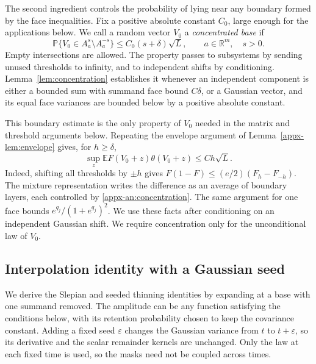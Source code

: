 \documentclass[11pt,letterpaper]{article}
\theoremstyle{remark}
\newcommand{\E}{\mathbb E}
\newcommand{\Pp}{\mathbb P}
\newcommand{\R}{\mathbb R}
\begin{document}
The second ingredient controls the probability of lying near any
boundary formed by the face inequalities. Fix a positive absolute
constant \(C_0\), large enough for the applications below. We call
a random vector \(V_0\) a \emph{concentrated base} if
\begin{equation}
 \Pp\{V_0\in A_a^s\setminus A_a^{-s}\}
 \le C_0(s+\delta)\sqrt L,
 \qquad a\in\R^m,\quad s>0.
 \label{appx-an:concentration}
\end{equation}
Empty intersections are allowed. The property passes to subsystems
by sending unused thresholds to infinity, and to independent shifts
by conditioning. Lemma~\ref{lem:concentration} establishes it whenever an independent component is
either a bounded sum with summand face bound \(C\delta\), or a
Gaussian vector, and its equal face variances are bounded below by
a positive absolute constant.

This boundary estimate is the only property of \(V_0\) needed in the
matrix and threshold arguments below. Repeating the envelope argument of
Lemma~\ref{appx-lem:envelope} gives, for \(h\ge\delta\),
\begin{equation}
 \sup_z\E F(V_0+z)\theta(V_0+z)\le Ch\sqrt L.
 \label{appx-an:weight-concentration}
\end{equation}
Indeed, shifting all thresholds by \(\pm h\) gives
\(F(1-F)\le(e/2)(F_h-F_{-h})\). The mixture representation writes
the difference as an average of boundary layers, each controlled by
\eqref{appx-an:concentration}. The same argument for one face bounds
\(e^{q_j}/(1+e^{q_j})^2\). We use these facts after conditioning on
an independent Gaussian shift. We require concentration only for the
unconditional law of \(V_0\).

\subsection{Interpolation identity with a Gaussian seed}
\label{appx-an:sec:path}

We derive the Slepian and seeded thinning identities by expanding at
a base with one summand removed. The amplitude can be any function
satisfying the conditions below, with its retention probability chosen
to keep the covariance constant. Adding a fixed seed \(\varepsilon\)
changes the Gaussian variance from \(t\) to \(t+\varepsilon\),
so its derivative and the scalar remainder kernels are unchanged.
Only the law at each fixed time is used, so the masks need not be
coupled across times.
\end{document}
